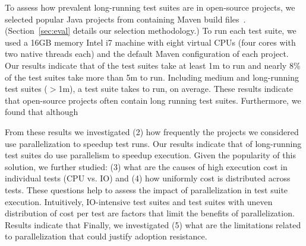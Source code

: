 

To assess how prevalent long-running test suites are in open-source
projects, we selected \numSubjs{} popular Java projects from \github{}
containing Maven build files~\cite{maven}.  (Section~\ref{sec:eval}
details our selection methodology.)  To run each test suite, we used a
16GB memory Intel i7 machine with
eight virtual CPUs (four cores with two native threads each) and the
default Maven configuration of each project.  Our results indicate
that \percentMedLongRunning{} of the test suites take at least 1m to
run and nearly 8\% of the test suites take more than 5m to run.
Including medium and long-running test suites ($>$1m), a test suite
takes \averageMedLongRunning{} to run, on average.  These results
indicate that open-source projects often contain long running test
suites.  Furthermore, we found that although 

  From these results we
investigated (2) how frequently the projects we considered use
parallelization to speedup test runs.  Our results indicate that
\percentParallelForLongRunning{} of long-running test suites do use
parallelism to speedup execution.  Given the popularity of this
solution, we further studied: (3) what are the causes of high
execution cost in individual tests (CPU vs. IO) and (4) how uniformly
cost is distributed across tests.  These questions help to assess the
impact of parallelization in test suite execution.  Intuitively,
IO-intensive test suites and test suites with uneven distribution of
cost per test are factors that limit the benefits of parallelization.
Results indicate that   Finally, we investigated (5) what are
the limitations related to parallelization that could justify adoption
resistance.

\Fix{--------------}

